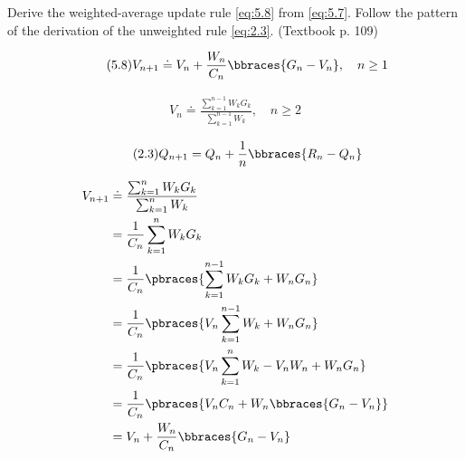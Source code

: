 
\begin{exercise}[Exercise 5.10]

Derive the weighted-average update rule \eqref{eq:5.8} from \eqref{eq:5.7}.
Follow the pattern of the derivation of the unweighted rule \eqref{eq:2.3}.
(Textbook p. 109)

\end{exercise}


\begin{solution}

\begin{align} \label{eq:5.8} \tag{5.8}
    V_{n+1}
    \doteq
    V_n + \frac{W_n}{C_n} \bbraces{G_n - V_n},
    \quad
    n \geq 1
\end{align}

\begin{align} \label{eq:5.7} \tag{5.7}
    V_n
    \doteq
    \frac
    {
        \sum_{k=1}^{n-1} W_k G_k
    }{
        \sum_{k=1}^{n-1} W_k
    },
    \quad
    n \geq 2
\end{align}

\begin{align} \label{eq:2.3} \tag{2.3}
    Q_{n+1}
    =
    Q_n + \frac{1}{n} \bbraces{R_n - Q_n}
\end{align}

\begin{align*}
    V_{n+1}
    & \doteq
    \frac
    {
        \sum_{k=1}^n W_k G_k
    }{
        \sum_{k=1}^n W_k
    } \\
    & =
    \frac{1}{C_n}
    \sum_{k=1}^n W_k G_k \\
    & =
    \frac{1}{C_n}
    \pbraces
    {
        \sum_{k=1}^{n-1} W_k G_k
        +
        W_n G_n
    } \\
    & =
    \frac{1}{C_n}
    \pbraces
    {
        V_n \sum_{k=1}^{n-1} W_k
        +
        W_n G_n
    } \\
    & =
    \frac{1}{C_n}
    \pbraces
    {
        V_n \sum_{k=1}^n W_k
        -
        V_n W_n
        +
        W_n G_n
    } \\
    & =
    \frac{1}{C_n}
    \pbraces
    {
        V_n C_n
        +
        W_n \bbraces{G_n - V_n}
    } \\
    & =
    V_n + \frac{W_n}{C_n} \bbraces{G_n - V_n}
\end{align*}
    
\end{solution}

